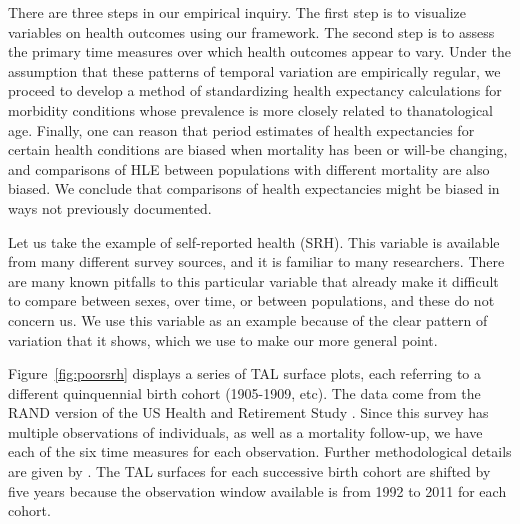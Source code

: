 \documentclass[12pt,oneside,a4paper]{article} %
\begin{document}
There are three steps in our empirical inquiry. The first step is to visualize
variables on health outcomes using our framework. The second step is to
assess the primary time measures over which health outcomes appear to vary.
Under the assumption that these patterns of temporal variation are empirically regular,
we proceed to develop a method of standardizing health expectancy calculations
for morbidity conditions whose prevalence is more closely related
to thanatological age.
Finally, one can reason that period estimates of health expectancies for certain
health conditions are biased when mortality has been or will-be changing, and
comparisons of HLE between populations with different mortality are also biased.
We conclude that comparisons of health expectancies might be biased in ways not
previously documented.

Let us take the example of self-reported health (SRH). This variable is
available from many different survey sources, and it is familiar to many researchers. There are
many known pitfalls to this particular variable that already make it difficult
to compare between sexes, over time, or between populations, and these do not
concern us. We use this variable as an example because of the clear
pattern of variation that it shows, which we use to make our more general point.

Figure~\ref{fig:poorsrh} displays a series of TAL surface plots, each referring
to a different quinquennial birth cohort (1905-1909, etc). The data come from
the RAND version of the US Health and Retirement Study \citep{HRS}. Since this
survey has multiple observations of individuals, as well as a mortality
follow-up, we have each of the six time measures for each observation. Further
methodological details are given by \citet{riffe2015ttd}. The TAL surfaces for
each successive birth cohort are shifted by five years because the observation
window available is from 1992 to 2011 for each cohort.
\end{document}
